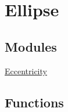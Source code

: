 \hypertarget{group___e_g_x_math-_geometry-2_d-_ellipse}{}\section{Ellipse}
\label{group___e_g_x_math-_geometry-2_d-_ellipse}
\subsection*{Modules}
\begin{DoxyCompactItemize}
\item 
\mbox{\hyperlink{group___e_g_x_math-_geometry-2_d-_ellipse-_eccentricity}{Eccentricity}}
\end{DoxyCompactItemize}
\subsection*{Functions}
